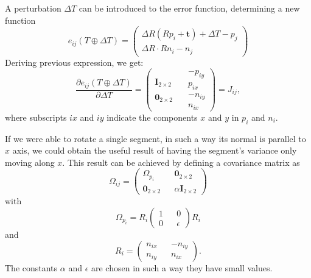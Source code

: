 \documentclass[a4paper, onecolumn]{report}
\begin{document}
A perturbation $\Delta T$ can be introduced to the error function, determining a new function
\begin{equation}
	e_{ij}(T \oplus \Delta T) = \left(\begin{matrix} \Delta R(Rp_i + \textbf{t}) + \Delta T - p_j \\ \Delta R \cdot Rn_i - n_j \end{matrix}\right)
\end{equation}
Deriving previous expression, we get:
\begin{equation}
	\frac{\partial e_{ij}(T \oplus \Delta T)}{\partial \Delta T} = \left(\begin{matrix} \textbf{I}_{2 \times 2} \\ \\ \textbf{0}_{2 \times 2} \end{matrix} \quad \begin{matrix} -p_{iy} \\ p_{ix} \\ -n_{iy} \\ n_{ix}\end{matrix}\right) = J_{ij},
\end{equation}
where subscripts $ix$ and $iy$ indicate the components $x$ and $y$ in $p_i$ and $n_i$.

If we were able to rotate a single segment, in such a way its normal is parallel to $x$ axis, we could obtain the useful result of having the segment's variance only moving along $x$. This result can be achieved by defining a covariance matrix as
\begin{equation}
	\Omega_{ij} = \left(\begin{matrix} \Omega_{p_i} && \textbf{0}_{2\times2} \\ \textbf{0}_{2\times2} && \alpha \textbf{I}_{2\times2} \end{matrix}\right)
\end{equation}
with
\begin{equation} \Omega_{p_i} = R_i\left(\begin{matrix} 1 && 0 \\ 0 && \epsilon \end{matrix}\right)R_i\end{equation}
and
\begin{equation}
	R_i = \left(\begin{matrix} n_{ix} && -n_{iy} \\ n_{iy} && n_{ix} \end{matrix} \right).
\end{equation}
The constants $\alpha$ and $\epsilon$ are chosen in such a way they have small values.
\end{document}
